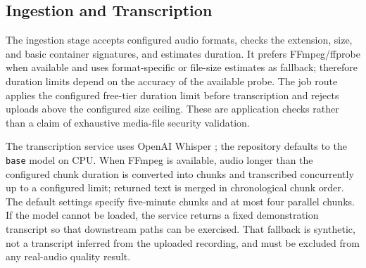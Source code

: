 \documentclass[conference]{IEEEtran}
\begin{document}
\subsection{Ingestion and Transcription}
The ingestion stage accepts configured audio formats, checks the extension, size, and basic container signatures, and estimates duration. It prefers FFmpeg/ffprobe when available and uses format-specific or file-size estimates as fallback; therefore duration limits depend on the accuracy of the available probe. The job route applies the configured free-tier duration limit before transcription and rejects uploads above the configured size ceiling. These are application checks rather than a claim of exhaustive media-file security validation.

The transcription service uses OpenAI Whisper \cite{whisper}; the repository defaults to the \texttt{base} model on CPU. When FFmpeg is available, audio longer than the configured chunk duration is converted into chunks and transcribed concurrently up to a configured limit; returned text is merged in chronological chunk order. The default settings specify five-minute chunks and at most four parallel chunks. If the model cannot be loaded, the service returns a fixed demonstration transcript so that downstream paths can be exercised. That fallback is synthetic, not a transcript inferred from the uploaded recording, and must be excluded from any real-audio quality result.
\end{document}
